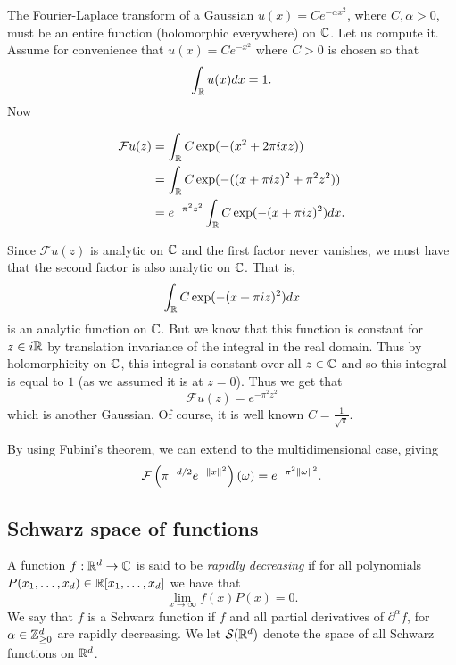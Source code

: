 \documentclass[twoside, a4paper, 10pt]{amsart}
\begin{document}
\begin{eg}\label{eg: FT of Gaussian} The Fourier-Laplace transform of a Gaussian $u(x) = C e^{- \alpha x^2}$, where $C,\alpha>0$, must be an entire function (holomorphic everywhere) on $\mathbb{C}$. Let us compute it. Assume for convenience that $u(x) = C e^{-x^2}$ where $C>0$ is chosen so that $$\int_{\mathbb{R}} u(x) dx = 1.$$ Now 

\begin{align*} \mathcal{F}u (z) &=  \int_{\mathbb{R}} C \exp ( -(x^2 + 2\pi i x z)) \\ &=  \int_{\mathbb{R}} C\exp (- ((x+\pi i z)^2 + \pi^2 z^2)) \\ &=  e^{-\pi^2z^2} \int_{\mathbb{R}} C \exp(-(x+\pi i z)^2) dx. \end{align*}

Since $\mathcal{F}u(z)$ is analytic on $\mathbb{C}$ and the first factor never vanishes, we must have that the second factor is also analytic on $\mathbb{C}$. That is, $$\int_{\mathbb{R}} C \exp(-(x+\pi i z)^2) dx$$ is an analytic function on $\mathbb{C}$. But we know that this function is constant for $z \in i \mathbb{R}$ by translation invariance of the integral in the real domain. Thus by holomorphicity on $\mathbb{C}$, this integral is constant over all $z \in \mathbb{C}$ and so this integral is equal to $1$ (as we assumed it is at $z=0$). Thus we get that $$\mathcal{F}u(z) = e^{-\pi^2 z^2}$$ which is another Gaussian. Of course, it is well known $C = \frac{1}{\sqrt{\pi}}$.

By using Fubini's theorem, we can extend to the multidimensional case, giving $$\mathcal{F} \left( \pi^{-d/2} e^{-\|x\|^2} \right) (\omega) = e^{-\pi^2 \|\omega \|^2} . $$

\end{eg}

\subsection{Schwarz space of functions}

\begin{mydef} A function $f:\mathbb{R}^d \to \mathbb{C}$ is said to be \textit{rapidly decreasing} if for all polynomials $P(x_1, \dots, x_d) \in \mathbb{R}[x_1, \ldots, x_d]$ we have that $$\lim_{x \to \infty} f(x)P(x) = 0.$$ We say that $f$ is a Schwarz function if $f$ and all partial derivatives of $\partial^{\alpha}f$, for $\alpha \in \mathbb{Z}_{\geq 0}^d$ are rapidly decreasing. We let $\mathcal{S}(\mathbb{R}^d)$ denote the space of all Schwarz functions on $\mathbb{R}^d$.

\end{mydef}
\end{document}
